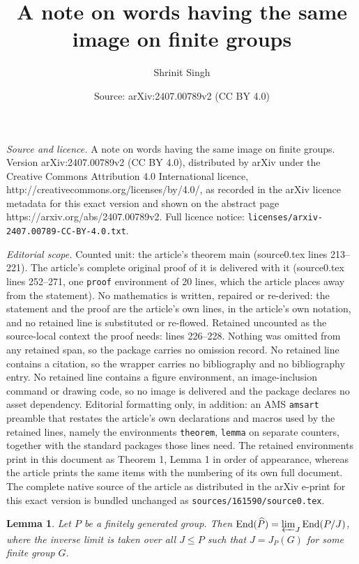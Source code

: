 \documentclass[10pt,a4paper]{amsart}
\title{A note on words having the same image on finite groups}
\author{Shrinit Singh}
\date{Source: arXiv:2407.00789v2 (CC BY 4.0)}
\newtheorem{lemma}{Lemma}
\begin{document}
\maketitle

\noindent\emph{Source and licence.} A note on words having the same image on finite groups. Version arXiv:2407.00789v2 (CC BY 4.0), distributed by arXiv under the Creative Commons Attribution 4.0 International licence, http://creativecommons.org/licenses/by/4.0/, as recorded in the arXiv licence metadata for this exact version and shown on the abstract page https://arxiv.org/abs/2407.00789v2. Full licence notice: \texttt{licenses/arxiv-2407.00789-CC-BY-4.0.txt}.\par\smallskip

\noindent\textit{Editorial scope.} Counted unit: the article's theorem main (source0.tex lines 213--221). The article's complete original proof of it is delivered with it (source0.tex lines 252--271, one \texttt{proof} environment of 20 lines, which the article places away from the statement). No mathematics is written, repaired or re-derived: the statement and the proof are the article's own lines, in the article's own notation, and no retained line is substituted or re-flowed.  Retained uncounted as the source-local context the proof needs: lines 226--228.  Nothing was omitted from any retained span, so the package carries no omission record.  No retained line contains a citation, so the wrapper carries no bibliography and no bibliography entry.  No retained line contains a figure environment, an image-inclusion command or drawing code, so no image is delivered and the package declares no asset dependency.  Editorial formatting only, in addition: an AMS \texttt{amsart} preamble that restates the article's own declarations and macros used by the retained lines, namely the environments \texttt{theorem}, \texttt{lemma} on separate counters, together with the standard packages those lines need.  The retained environments print in this document as Theorem 1, Lemma 1 in order of appearance, whereas the article prints the same items with the numbering of its own full document.  The complete native source of the article as distributed in the arXiv e-print for this exact version is bundled unchanged as \texttt{sources/161590/source0.tex}.
\begin{lemma}\label{promon}
    Let $P$ be a finitely generated group. Then $\mathrm{End} (\widehat{P}) = \varprojlim_{J} \mathrm{End}(P/J)$, where the inverse limit is taken over all $J \leq P$ such that $J = J_P(G)$ for some finite group $G.$
\end{lemma}
\end{document}
